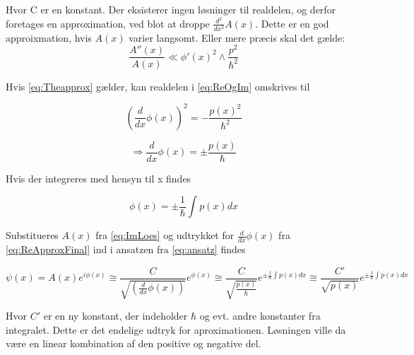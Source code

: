 Hvor C er en konstant. Der eksisterer ingen løsninger til realdelen, og derfor foretages en approximation, ved blot at droppe $\frac{d^{2}}{d x^{2}}  A{\left (x \right )}$. Dette er en god approixmation, hvis $A(x)$ varier langsomt. Eller mere præcis skal det gælde:
\begin{equation}
    \frac{A''(x)}{A(x)} \ll \phi'(x)^{2}\wedge \frac{p^{2}}{\hbar^{2}}
    \label{eq:Theapprox}
\end{equation}

Hvis \cref{eq:Theapprox} gælder, kan realdelen i \cref{eq:ReOgIm} omskrives til

\begin{equation}
    \left(\frac{d}{d x} \phi{\left (x \right )}\right)^{2}
    = - \frac{p(x)^2}{\hbar^2}
    \label{eq:ReApprox}
\end{equation}

\begin{equation}
    \Rightarrow \frac{d}{d x} \phi{\left (x \right )}
    = \pm \frac{p(x)}{\hbar}
    \label{eq:ReApproxFinal}
\end{equation}

Hvis der integreres med hensyn til x findes

\begin{equation}
    \phi(x) = \pm \frac{1}{\hbar} \int p(x) dx
    \label{eq:thisPhi}
\end{equation}

Substitueres $A(x)$ fra \cref{eq:ImLoes} og udtrykket for $\frac{d}{d x} \phi{\left (x \right )}$ fra \cref{eq:ReApproxFinal}  ind i ansatzen fra \cref{eq:ansatz} findes

\begin{equation}
    \psi(x) = A(x) e^{i \phi(x)} \cong
    \frac{C}{\sqrt{(\frac{d}{d x} \phi{\left (x \right )})}} e^{\phi(x)} \cong
    \frac{C}{\sqrt{\frac{p(x)}{\hbar}}} e^{\pm \frac{1}{\hbar} \int p(x) dx} \cong
    \frac{C'}{\sqrt{p(x)}} e^{\pm \frac{1}{\hbar} \int p(x) dx}
    \label{eq:final}
\end{equation}

Hvor $C'$ er en ny konstant, der indeholder $\hbar$ og evt. andre konstanter fra integralet. Dette er det endelige udtryk for aproximationen. Løsningen ville da være en linear kombination af den positive og negative del.
